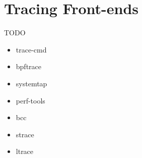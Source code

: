 \section{Tracing Front-ends}

TODO

\begin{itemize}

  \item trace-cmd

  \item bpftrace

  \item systemtap

  \item perf-tools

  \item bcc

  \item strace

  \item ltrace

\end{itemize}
